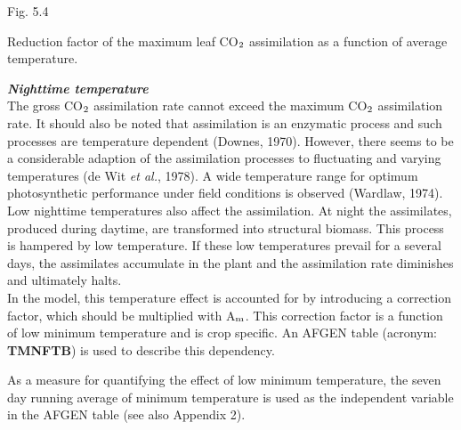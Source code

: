 \begin{figure}[htbp]
\begin{forcewidth}{8.44cm}
 \begin{center} \end{center}
\end{forcewidth}
\end{figure}














Fig. 5.4 
\testlastline

\begin{indenting}{2.54cm}
Re\-duc\-tion fac\-tor of the ma\-xi\-mum leaf CO$_{{\rm 2}}$ assimila\-tion as a function of
average tempera\-ture.
\end{indenting}



{\bf {\it Nighttime temperature\/}}\\
The gross CO$_{{\rm 2}}$ assimilation rate cannot exceed the maximum CO$_{{\rm 2}}$ assimilation rate. It
should also be noted that assimilation is an enzymatic process and such processes are
temperature dependent (Downes, 1970). However, there seems to be a consider\-able
adaption of the assimilation processes to fluctuating and varying temperatures (de Wit {\it et
al.\/}, 1978). A wide temperature range for optimum photosynthetic perfor\-mance under field
conditions is observed (Wardlaw, 1974). Low nighttime tempera\-tures also affect the
assimilation. At night the assimilates, produced during daytime, are trans\-formed into
structural biomass. This process is hampered by low temperature. If these low tempera\-tures prevail for a several days, the assimilates accumulate in the plant and the assimila\-tion rate diminishes and ultimately halts.\\
 In the model, this tempera\-ture effect is account\-ed for by introducing a correction factor,
which should be multiplied with A$_{{\rm m}}$. This correction factor is a function of low minimum
tempera\-ture and is crop specific. An AFGEN table (acronym: {\bf TMNFTB}) is used to
describe this dependency.

As a measure for quantifying the effect of low minimum temperature, the seven day
running average of minimum tempera\-ture is used as the independent variable in the
AFGEN table (see also Appendix 2).

